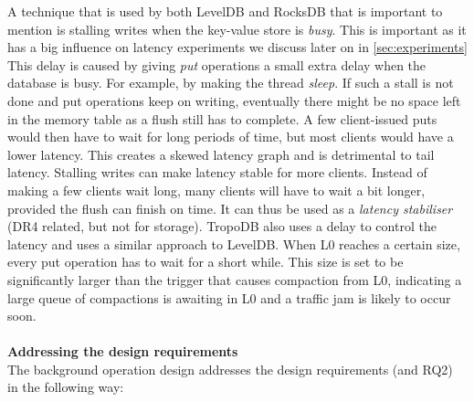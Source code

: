 A technique that is used by both LevelDB and RocksDB that is important to mention is stalling writes when the key-value store is \textit{busy}. This is important as it has a big influence on latency experiments we discuss later on in \autoref{sec:experiments} This delay is caused by giving \textit{put} operations a small extra delay when the database is busy. For example, by making the thread \textit{sleep}. If such a stall is not done and put operations keep on writing, eventually there might be no space left in the memory table as a flush still has to complete. A few client-issued puts would then have to wait for long periods of time, but most clients would have a lower latency. This creates a skewed latency graph and is detrimental to tail latency. Stalling writes can make latency stable for more clients. Instead of making a few clients wait long, many clients will have to wait a bit longer, provided the flush can finish on time. It can thus be used as a \textit{latency stabiliser} (DR4 related, but not for storage). TropoDB also uses a delay to control the latency and uses a similar approach to LevelDB. When L0 reaches a certain size, every put operation has to wait for a short while. This size is set to be significantly larger than the trigger that causes compaction from L0, indicating a large queue of compactions is awaiting in L0 and a traffic jam is likely to occur soon.\\\\
\textbf{Addressing the design requirements}\\
The background operation design addresses the design requirements (and RQ2) in the following way:
